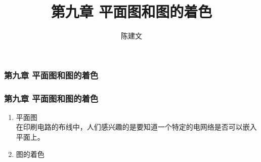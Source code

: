 \documentclass{beamer}
\begin{document}
\begin{CJK}{UTF8}{gbsn}
\newtheorem*{Exercise}{习题}
\newtheorem{Thm}{定理}[section]
\newtheorem*{Thm1}{定理1.1}
\newtheorem*{Thm2}{定理4.1}
\newtheorem*{Thm3}{定理4.5}
\newtheorem*{Thm4.5}{定理4.5}
\newtheorem{Cor}{推论}
\theoremstyle{definition}
\newtheorem{Def}{定义}[section]
\newtheorem*{Def1}{定义}
\newtheorem*{Thm4}{定理}
\theoremstyle{example}
\newtheorem*{Ex}{例：}
\date{}
\author{陈建文}

\title{第九章 平面图和图的着色}
\begin{frame}
  \titlepage
  
\end{frame}
\begin{frame}
  \frametitle{第九章 平面图和图的着色}
\end{frame}

\begin{frame}
  \frametitle{第九章 平面图和图的着色}
  \begin{enumerate}
  \item 平面图\\
\pause
在印刷电路的布线中，人们感兴趣的是要知道一个特定的电网络是否可以嵌入平面上。
\pause
\item 图的着色\\
  \end{enumerate}
\end{frame}


\end{CJK}
\end{document}
